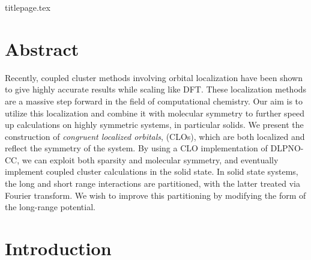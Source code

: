 \documentclass[letterpaper, 12pt]{article}
\begin{document}
{titlepage.tex} %

\newpage %

\setcounter{page}{2}
\section*{Abstract}
Recently, coupled cluster methods involving orbital localization have been shown to give highly accurate results while scaling like DFT. These localization methods are a massive step forward in the field of computational chemistry. Our aim is to utilize this localization and combine it with molecular symmetry to further speed up calculations on highly symmetric systems, in particular solids. We present the construction of \textit{congruent localized orbitals}, (CLOs), which are both localized and reflect the symmetry of the system. By using a CLO implementation of DLPNO-CC, we can exploit both sparsity and molecular symmetry, and eventually implement coupled cluster calculations in the solid state. In solid state systems, the long and short range interactions are partitioned, with the latter treated via Fourier transform. We wish to improve this partitioning by modifying the form of the long-range potential. 
\newpage
\tableofcontents %
\listoffigures %
\printnomenclature[3cm]

 

\newpage 
{} %
\setcounter{page}{1} %



\section{Introduction}
\end{document}

